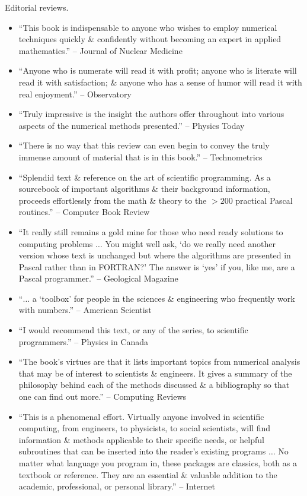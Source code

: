 \documentclass{article}
\begin{document}
\begin{enumerate}
	{\sf Editorial reviews.}
	\begin{itemize}
		\item ``This book is indispensable to anyone who wishes to employ numerical techniques quickly \& confidently without becoming an expert in applied mathematics.'' --  
		Journal of Nuclear Medicine
		\item ``Anyone who is numerate will read it with profit; anyone who is literate will read it with satisfaction; \& anyone who has a sense of humor will read it with real enjoyment.'' -- Observatory
		\item ``Truly impressive is the insight the authors offer throughout into various aspects of the numerical methods presented.'' -- Physics Today
		\item ``There is no way that this review can even begin to convey the truly immense amount of material that is in this book.'' -- Technometrics
		\item ``Splendid text \& reference on the art of scientific programming. As a sourcebook of important algorithms \& their background information, proceeds effortlessly from the math \& theory to the $> 200$ practical Pascal routines.'' -- Computer Book Review
		\item ``It really still remains a gold mine for those who need ready solutions to computing problems $\ldots$ You might well ask, `do we really need another version whose text is unchanged but where the algorithms are presented in Pascal rather than in FORTRAN?' The answer is `yes' if you, like me, are a Pascal programmer.'' -- Geological Magazine
		\item ``$\ldots$ a `toolbox' for people in the sciences \& engineering who frequently work with numbers.'' -- American Scientist
		\item ``I would recommend this text, or any of the series, to scientific programmers.'' -- Physics in Canada
		\item ``The book's virtues are that it lists important topics from numerical analysis that may be of interest to scientists \& engineers. It gives a summary of the philosophy behind each of the methods discussed \& a bibliography so that one can find out more.'' -- Computing Reviews
		\item ``This is a phenomenal effort. Virtually anyone involved in scientific computing, from engineers, to physicists, to social scientists, will find information \& methods applicable to their specific needs, or helpful subroutines that can be inserted into the reader's existing programs $\ldots$ No matter what language you program in, these packages are classics, both as a textbook or reference. They are an essential \& valuable addition to the academic, professional, or personal library.'' -- Internet
	\end{itemize}
	

\end{enumerate}
\end{document}
